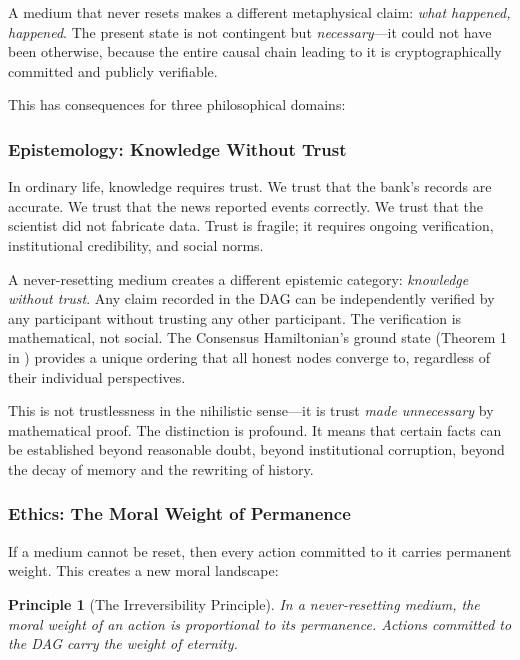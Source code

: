 \documentclass[12pt,a4paper]{article}
\theoremstyle{philosophical}
\newtheorem{principle}{Principle}
\begin{document}
A medium that never resets makes a different metaphysical claim: \emph{what happened, happened}. The present state is not contingent but \emph{necessary}---it could not have been otherwise, because the entire causal chain leading to it is cryptographically committed and publicly verifiable.

This has consequences for three philosophical domains:

\subsubsection{Epistemology: Knowledge Without Trust}

In ordinary life, knowledge requires trust. We trust that the bank's records are accurate. We trust that the news reported events correctly. We trust that the scientist did not fabricate data. Trust is fragile; it requires ongoing verification, institutional credibility, and social norms.

A never-resetting medium creates a different epistemic category: \emph{knowledge without trust}. Any claim recorded in the DAG can be independently verified by any participant without trusting any other participant. The verification is mathematical, not social. The Consensus Hamiltonian's ground state (Theorem 1 in \cite{qnk-physics}) provides a unique ordering that all honest nodes converge to, regardless of their individual perspectives.

This is not trustlessness in the nihilistic sense---it is trust \emph{made unnecessary} by mathematical proof. The distinction is profound. It means that certain facts can be established beyond reasonable doubt, beyond institutional corruption, beyond the decay of memory and the rewriting of history.

\subsubsection{Ethics: The Moral Weight of Permanence}

If a medium cannot be reset, then every action committed to it carries permanent weight. This creates a new moral landscape:

\begin{principle}[The Irreversibility Principle]
In a never-resetting medium, the moral weight of an action is proportional to its permanence. Actions committed to the DAG carry the weight of eternity.
\end{principle}
\end{document}
